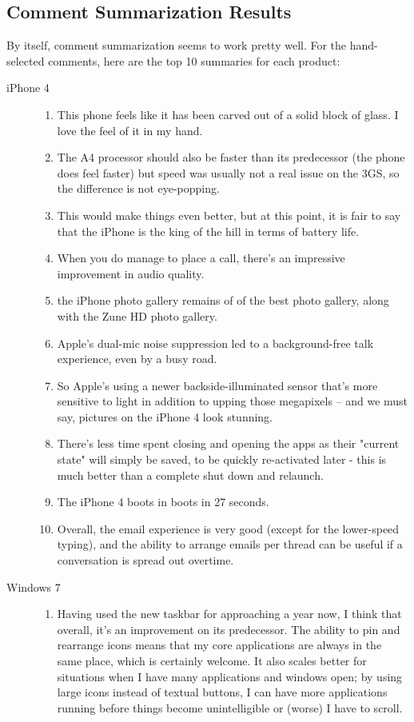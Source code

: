 \documentclass{article}
\begin{document}

\subsection{Comment Summarization Results}

By itself, comment summarization seems to work pretty well. For the
hand-selected comments, here are the top 10 summaries for each product:
\begin{description}
\item[iPhone 4]
\begin{enumerate}
\item This phone feels like it has been carved out of a solid block of glass. I love the feel of it in my hand.
\item The A4 processor should also be faster than its predecessor (the phone does feel faster) but speed was usually not a real issue on the 3GS, so the difference is not eye-popping.
\item This would make things even better, but at this point, it is fair to say that the iPhone is the king of the hill in terms of battery life.
\item When you do manage to place a call, there's an impressive improvement in audio quality.
\item the iPhone photo gallery remains of of the best photo gallery, along with the Zune HD photo gallery.
\item Apple's dual-mic noise suppression led to a background-free talk experience, even by a busy road.
\item So Apple's using a newer backside-illuminated sensor that's more sensitive to light in addition to upping those megapixels -- and we must say, pictures on the iPhone 4 look stunning.
\item There's less time spent closing and opening the apps as their "current state" will simply be saved, to be quickly re-activated later - this is much better than a complete shut down and relaunch.
\item The iPhone 4 boots in boots in 27 seconds.
\item Overall, the email experience is very good (except for the lower-speed typing), and the ability to arrange emails per thread can be useful if a conversation is spread out overtime.
\end{enumerate}
\item[Windows 7]
\begin{enumerate}
\item Having used the new taskbar for approaching a year now, I think that overall, it's an improvement on its predecessor. The ability to pin and rearrange icons means that my core applications are always in the same place, which is certainly welcome. It also scales better for situations when I have many applications and windows open; by using large icons instead of textual buttons, I can have more applications running before things become unintelligible or (worse) I have to scroll.

\end{enumerate}
\end{description}
\end{document}
